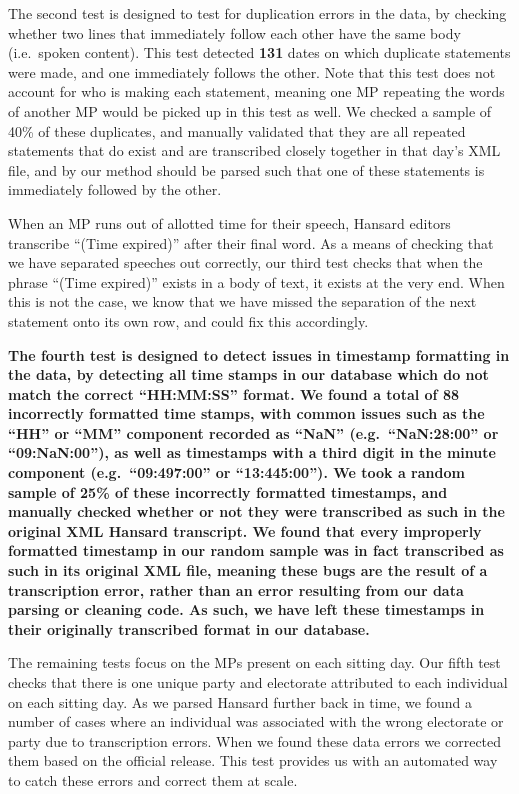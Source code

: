 \documentclass[
  letterpaper,
  DIV=11,
  numbers=noendperiod]{scrartcl}
\begin{document}
The second test is designed to test for duplication errors in the data,
by checking whether two lines that immediately follow each other have
the same body (i.e.~spoken content). This test detected \textbf{131}
dates on which duplicate statements were made, and one immediately
follows the other. Note that this test does not account for who is
making each statement, meaning one MP repeating the words of another MP
would be picked up in this test as well. We checked a sample of 40\% of
these duplicates, and manually validated that they are all repeated
statements that do exist and are transcribed closely together in that
day's XML file, and by our method should be parsed such that one of
these statements is immediately followed by the other.

When an MP runs out of allotted time for their speech, Hansard editors
transcribe ``(Time expired)'' after their final word. As a means of
checking that we have separated speeches out correctly, our third test
checks that when the phrase ``(Time expired)'' exists in a body of text,
it exists at the very end. When this is not the case, we know that we
have missed the separation of the next statement onto its own row, and
could fix this accordingly.

\textbf{The fourth test is designed to detect issues in timestamp
formatting in the data, by detecting all time stamps in our database
which do not match the correct ``HH:MM:SS'' format. We found a total of
88 incorrectly formatted time stamps, with common issues such as the
``HH'' or ``MM'' component recorded as ``NaN'' (e.g.~``NaN:28:00'' or
``09:NaN:00''), as well as timestamps with a third digit in the minute
component (e.g.~``09:497:00'' or ``13:445:00''). We took a random sample
of 25\% of these incorrectly formatted timestamps, and manually checked
whether or not they were transcribed as such in the original XML Hansard
transcript. We found that every improperly formatted timestamp in our
random sample was in fact transcribed as such in its original XML file,
meaning these bugs are the result of a transcription error, rather than
an error resulting from our data parsing or cleaning code. As such, we
have left these timestamps in their originally transcribed format in our
database.}

The remaining tests focus on the MPs present on each sitting day. Our
fifth test checks that there is one unique party and electorate
attributed to each individual on each sitting day. As we parsed Hansard
further back in time, we found a number of cases where an individual was
associated with the wrong electorate or party due to transcription
errors. When we found these data errors we corrected them based on the
official release. This test provides us with an automated way to catch
these errors and correct them at scale.
\end{document}
